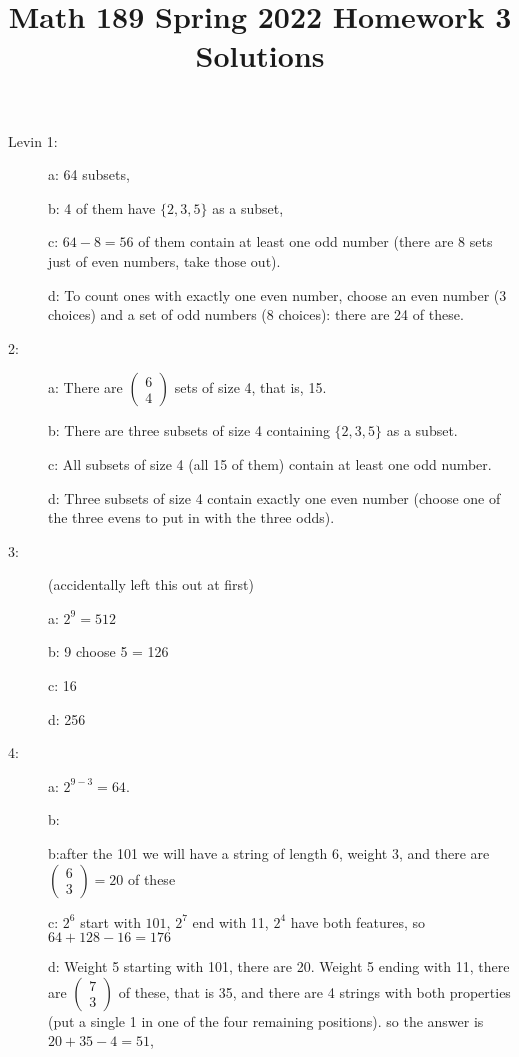 \documentclass[12pt]{article}
\title{Math 189 Spring 2022 Homework 3 Solutions}
\begin{document}
\maketitle

\begin{description}

\item[Levin 1:]  a: 64 subsets, 

b: 4 of them have $\{2,3,5\}$ as a subset, 

c: $64-8 = 56$ of them contain at least one odd number (there are 8 sets just of even numbers, take those out). 

d: To count ones with exactly one even number, choose an even number (3 choices) and a set of odd numbers (8 choices):  there are 24 of these.

\item[2:]  a: There are $\left(\begin{array}{c}6\\4 \end{array}\right)$ sets of size 4, that is, 15.  

b: There are three subsets of size 4 containing $\{2,3,5\}$ as a subset.

c: All subsets of size 4 (all 15 of them) contain at least one odd number.

d: Three subsets of size 4 contain exactly one even number (choose one of the three evens to put in with the three odds).
\item[3:]  (accidentally left this out at first)

a:  $2^9 = 512$

b:  9 choose 5 = 126

c:  16

d:  256


\item[4:] a: $2^{9-3} = 64$.  

b:  

b:after the 101 we will have a string of length 6, weight 3, and there are $\left(\begin{array}{c}6\\3 \end{array}\right)= 20$ of these

c: $2^6$ start with $101$, $2^7$ end with 11, $2^4$ have both features, so $64+128-16 = 176$

d: Weight 5 starting with 101, there are 20.  Weight 5 ending with 11, there are $\left(\begin{array}{c}7\\3 \end{array}\right)$ of these, that is 35, and there are 4 strings with both properties (put a single 1 in one of the four remaining positions).
so the answer is $20+35-4=51$,


\end{description}
\end{document}
